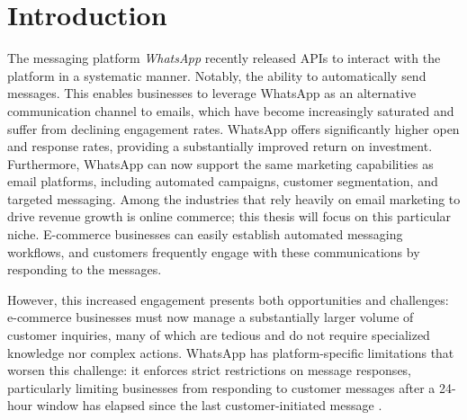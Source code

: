 \chapter{Introduction}
\label{cha:introduction}



The messaging platform \textit{WhatsApp} recently released APIs to interact with the platform in a systematic manner. Notably, the ability to automatically send messages.
This enables businesses to leverage WhatsApp as an alternative communication channel to emails, which have become increasingly saturated and suffer from declining engagement rates.
WhatsApp offers significantly higher open and response rates, providing a substantially improved return on investment. Furthermore, WhatsApp can now support the same marketing capabilities as email platforms, including automated campaigns, customer segmentation, and targeted messaging.
Among the industries that rely heavily on email marketing to drive revenue growth is online commerce; this thesis will focus on this particular niche.
E-commerce businesses can easily establish automated messaging workflows, and customers frequently engage with these communications by responding to the messages.


However, this increased engagement presents both opportunities and challenges: e-commerce businesses must now manage a substantially larger volume of customer inquiries, many of which are tedious and do not require specialized knowledge nor complex actions.
WhatsApp has platform-specific limitations that worsen this challenge: it enforces strict restrictions on message responses, particularly limiting businesses from responding to customer messages after a 24-hour window has elapsed since the last customer-initiated message \cite{wa_policy}.


